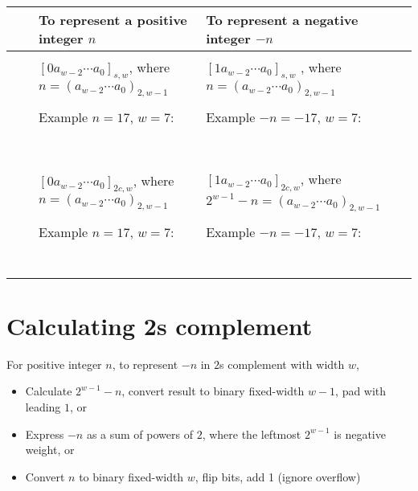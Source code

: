 \documentclass[12pt, oneside]{article}
\begin{document}
\begin{tabular}{|cc|p{3.4in}|p{3.7in}|}
\hline
& & To  represent a positive integer $n$ & To represent a negative integer $-n$\\
\hline
&& &  \\
&\parbox[t]{2mm}{} &
$[ 0a_{w-2} \cdots a_0]_{s,w}$, where $n =  (a_{w-2} \cdots a_0)_{2,w-1}$& 
$[1a_{w-2} \cdots a_0]_{s,w}$
, where $n =  (a_{w-2} \cdots a_0)_{2,w-1}$\\
&& & \\
&& Example $n=17$, $w=7$:  & Example $-n=-17$, $w=7$: \\
&& & \\
&& & \\
&& & \\
&& & \\
&& & \\
&& & \\
&& & \\
\hline
&&  &  \\
&\parbox[t]{2mm}{} &
$[0a_{w-2} \cdots a_0]_{2c,w}$, where $n =  (a_{w-2} \cdots a_0)_{2,w-1}$& $[1a_{w-2} \cdots a_0]_{2c,w}$, where $2^{w-1} - n =  (a_{w-2} \cdots a_0)_{2,w-1}$\\
&& & \\
&& Example $n=17$, $w=7$:  & Example $-n=-17$, $w=7$: \\
&& & \\
&& & \\
&& & \\
&& & \\
&& & \\
&& & \\
&& & \\
\hline
\end{tabular} \vfill
\section*{Calculating 2s complement}


For positive integer $n$, to represent $-n$ in 
$2$s complement with width $w$,
\begin{itemize}
    \item Calculate $2^{w-1} - n$, convert 
    result to binary fixed-width $w-1$, pad 
    with leading $1$, or
    \item Express $-n$ as a sum of powers of $2$, 
    where the leftmost $2^{w-1}$ is negative weight, or
    \item Convert $n$ to binary fixed-width $w$, 
    flip bits, add 1 (ignore overflow)
\end{itemize}
\end{document}
